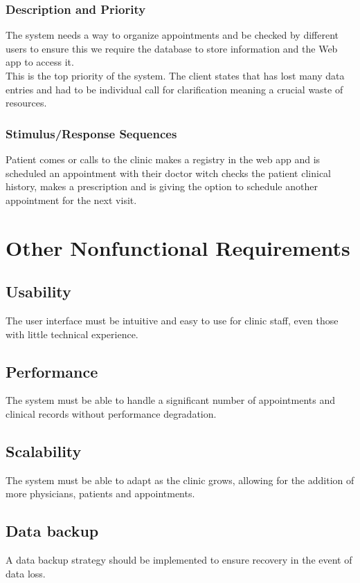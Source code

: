\documentclass{scrreprt}
\begin{document}
	 
	
	\subsection{Description and Priority}
	The system needs a way to organize appointments and be checked by different users to ensure this we require the database to store information and the Web app to access it.\\
	This is the top priority of the system. The client states that has lost many data entries and had to be individual call for clarification meaning a crucial waste of resources. 
	
	\subsection{Stimulus/Response Sequences}
	 Patient comes or calls to the clinic makes a registry in the web app and is scheduled an appointment with their doctor witch checks the patient clinical history, makes a prescription and is giving the option to schedule another appointment for the next visit.
	
	
	
	\chapter{Other Nonfunctional Requirements}
	\section{Usability}
	The user interface must be intuitive and easy to use for clinic staff, even those with little technical experience.
	\section{Performance}
	The system must be able to handle a significant number of appointments and clinical records without performance degradation.
	\section{Scalability}
	The system must be able to adapt as the clinic grows, allowing for the addition of more physicians, patients and appointments.
	\section{Data backup}
	A data backup strategy should be implemented to ensure recovery in the event of data loss.
	
	
	
	
\end{document}
